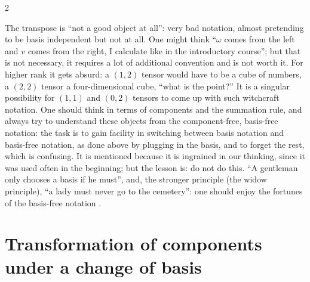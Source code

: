 \begin{paracol}{2}
\begin{remark}\label{rem:te-resist}
The transpose is ``not a good object at all'': very bad notation, almost pretending to be basis independent but not at all. One might think ``$\omega$ comes from the left and $v$ comes from the right, I calculate like in the introductory course''; but that is not necessary, it requires a lot of additional convention and is not worth it. For higher
rank it gets absurd: a $(1,2)$ tensor would have to be a cube of numbers, a $(2,2)$ tensor a four-dimensional cube, ``what is the point?'' It is a singular possibility for $(1,1)$ and $(0,2)$ tensors to come up with such witchcraft notation. One should think in terms of components and the summation rule, and always try to understand
these objects from the component-free, basis-free notation: the task is to gain facility in switching between basis notation and basis-free notation, as done above by plugging in the basis, and to forget the rest, which is confusing. It is mentioned because it is ingrained in our thinking, since it was used often in the beginning; but the lesson
is: do not do this. ``A gentleman only chooses a basis if he must'', and, the stronger principle (the widow principle), ``a lady must never go to the cemetery'': one should enjoy the fortunes of the basis-free notation
.
\end{remark}

\section{Transformation of components under a change of basis}\label{sec:te-transform}


\end{paracol}
